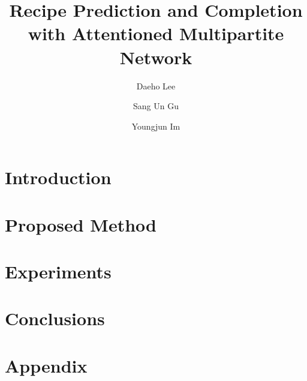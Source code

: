 \documentclass[sigconf, nonacm]{acmart}
\begin{document}
\newcommand{\beq}{\begin{equation}}
    \newcommand{\eeq}{\end{equation}}
\newcommand{\bit}{\begin{itemize*}}
    \newcommand{\eit}{\end{itemize*}}
\newcommand{\goal}[1]{ {\noindent {$\Rightarrow$} \em {#1} } }
\newcommand{\hide}[1]{}


\title{Recipe Prediction and Completion with Attentioned Multipartite Network}


\author{Daeho Lee}

\author{Sang Un Gu}

\author{Youngjun Im}

\begin{abstract}
  
\end{abstract}
\maketitle

\section{Introduction}
\label{sec:intro}


%

\section{Proposed Method}
\label{sec:proposed}



\section{Experiments}
\label{sec:experiments}


\section{Conclusions}
\label{sec:conclusions}





\newpage
\appendix
\section{Appendix}

\end{document}
